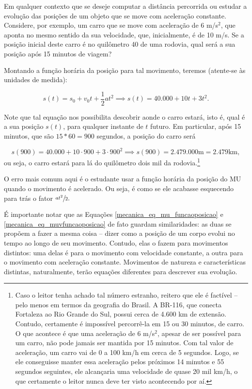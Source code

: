 
Em qualquer contexto que se deseje computar a distância percorrida ou estudar a evolução das posições de um objeto que se move com aceleração constante. Considere, por exemplo, um carro que se move com aceleração de 6 m/s$^2$, que aponta no mesmo sentido da sua velocidade, que, inicialmente, é de 10 m/s. Se a posição inicial deste carro é no quilômetro 40 de uma rodovia, qual será a sua posição após 15 minutos de viagem?

Montando a função horária da posição para tal movimento, teremos (atente-se às unidades de medida):

$$ s(t)=s_0+v_0t +\dfrac{1}{2}at^2 \implies s(t)=40.000+10t+3t^2.$$

Note que tal equação nos possibilita descobrir aonde o carro estará, isto é, qual é a sua posição $s(t)$, para qualquer instante de $t$ futuro. Em particular, após 15 minutos, que são $15*60=900$ segundos, a posição do carro será

$$s(900)= 40.000+10\cdot 900+3 \cdot 900^2 \implies \boxed{ s(900)=2.479.000 \text{m}=2.479 \text{km},}$$
ou seja, o carro estará para lá do quilômetro dois mil da rodovia.\footnote{Caso o leitor tenha achado tal número estranho, reitero que ele é factível -- pelo menos em termos da geografia do Brasil. A BR-116, que conecta Fortaleza ao Rio Grande do Sul, possui cerca de 4.600 km de extensão. Contudo, certamente é impossível percorrê-la em 15 ou 30 minutos, de carro. O que acontece é que uma aceleração de 6 m/s$^2$, apesar de ser possível para um carro, não pode jamais ser mantida por 15 minutos. Com tal valor de aceleração, um carro vai de 0 a 100 km/h em cerca de 5 segundos. Logo, se ele conseguisse manter essa aceleração pelos próximos 14 minutos e 55 segundos seguintes, ele alcançaria uma velocidade de quase 20 mil km/h, o que certamente o leitor nunca deve ter visto acontecendo por aí. }




O erro mais comum aqui é o estudante usar a função horária da posição do MU quando o movimento é acelerado. Ou seja, é como se ele acabasse esquecendo para trás o fator $\sfrac{at^2}{2}.$

É importante notar que as Equações \eqref{mecanica_eq_mu_funcaoposicao} e \eqref{mecanica_eq_muvfuncaoposicao} de fato guardam similaridades: as duas se propõem a fazer a mesma coisa -- dizer como a posição de um corpo evolui no tempo ao longo de seu movimento. Contudo, elas o fazem para movimentos distintos: uma delas é para o movimento com velocidade constante, a outra para o movimento com aceleração constante. Movimentos de natureza e características distintas, naturalmente, terão equações diferentes para descrever sua evolução.

